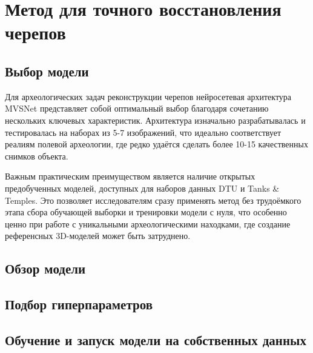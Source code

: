\chapter{Метод для точного восстановления черепов}

\section{Выбор модели}

Для археологических задач реконструкции черепов нейросетевая архитектура MVSNet
представляет собой оптимальный выбор благодаря сочетанию нескольких ключевых
характеристик. Архитектура изначально разрабатывалась и тестировалась на наборах
из 5-7 изображений, что идеально соответствует реалиям полевой археологии, где
редко удаётся сделать более 10-15 качественных снимков объекта.

Важным практическим преимуществом является наличие открытых предобученных
моделей, доступных для наборов данных DTU и Tanks \& Temples. Это позволяет
исследователям сразу применять метод без трудоёмкого этапа сбора обучающей
выборки и тренировки модели с нуля, что особенно ценно при работе с уникальными
археологическими находками, где создание референсных 3D-моделей может быть
затруднено.

\section{Обзор модели}
\section{Подбор гиперпараметров}
\section{Обучение и запуск модели на собственных данных}


